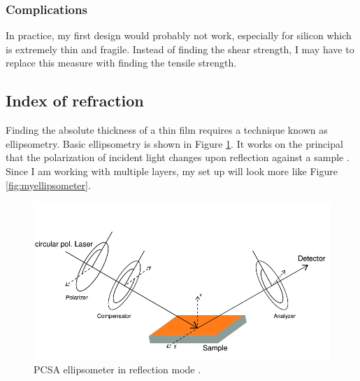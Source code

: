 \documentclass[colorlinks=true,pdfstartview=FitV,linkcolor=blue,
            citecolor=red,urlcolor=magenta]{ligodoc}
\begin{document}
\begin{appendices}
\subsubsection{Complications}

In practice, my first design would probably not work, especially for silicon which is extremely thin and fragile. Instead of finding the shear strength, I may have to replace this measure with finding the tensile strength.

\subsection{Index of refraction}

Finding the absolute thickness of a thin film requires a technique known as ellipsometry. Basic ellipsometry is shown in Figure \ref{fig:PCSAellipsometer}. It works on the principal that the polarization of incident light changes upon reflection against a sample \cite{Ohlidal}. Since I am working with multiple layers, my set up will look more like Figure \ref{fig:myellipsometer}.

\begin{figure}[htbp]
\begin{center}
\includegraphics[width=6in]{graphics/Ellipsometer-in-a-PCSA-configuration.png}
\caption{PCSA ellipsometer in reflection mode \cite{Kurz}.}
\label{fig:PCSAellipsometer}
\end{center}
\end{figure}


\end{appendices}
\end{document}

